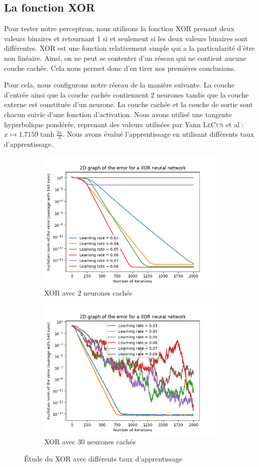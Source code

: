 \subsection{La fonction XOR}

Pour tester notre perceptron, nous utilisons la fonction XOR prenant deux valeurs binaires et retournant 1 si et seulement si les deux valeurs binaires sont
différentes. XOR est une fonction relativement simple qui a la particularité d'être non linéaire. Ainsi, on ne peut se contenter d'un réseau qui ne contient aucune
couche cachée. Cela nous permet donc d'en tirer nos premières conclusions.

Pour cela, nous configurons notre réseau de la manière suivante. La couche d'entrée ainsi que la couche cachée contiennent 2 neurones tandis que la couche externe
est constituée d'un neurone. La couche cachée et la couche de sortie sont chacun suivie d'une fonction d'activation. Nous avons utilisé une tangente hyperbolique
pondérée, reprenant des valeurs utilisées par Yann \textsc{LeCun} et al : $ x \mapsto 1.7159\tanh{\frac{2x}{3}}$. Nous avons évalué l'apprentissage en utilisant différents
taux d'apprentissage.

\begin{figure}[h]
 \centering
 \begin{subfigure}{0.5\textwidth}
  \centering
  \includegraphics[width=0.6\linewidth]{img/XOR2D.png}
  \caption{XOR avec 2 neurones cachés}
  \label{fig:xor2D-2}
 \end{subfigure}
 \begin{subfigure}{0.4\textwidth}
  \centering
  \includegraphics[width=0.8\linewidth]{img/XOR30.png}
  \caption{XOR avec 30 neurones cachés}
  \label{fig:xor2D-30}
 \end{subfigure}
 \caption{Étude du XOR avec différents taux d'apprentissage}
 \label{fig:xor2D}
\end{figure}
 
